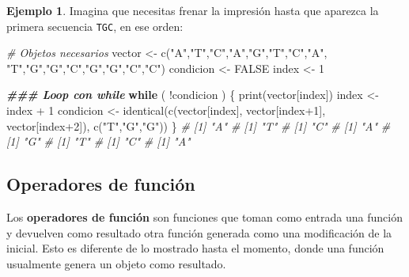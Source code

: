 \documentclass[
]{article}
\newenvironment{Shaded}{\begin{snugshade}}{\end{snugshade}}
\newcommand{\CommentTok}[1]{\textcolor[rgb]{0.56,0.35,0.01}{\textit{#1}}}
\newcommand{\ConstantTok}[1]{\textcolor[rgb]{0.00,0.00,0.00}{#1}}
\newcommand{\ControlFlowTok}[1]{\textcolor[rgb]{0.13,0.29,0.53}{\textbf{#1}}}
\newcommand{\DecValTok}[1]{\textcolor[rgb]{0.00,0.00,0.81}{#1}}
\newcommand{\DocumentationTok}[1]{\textcolor[rgb]{0.56,0.35,0.01}{\textbf{\textit{#1}}}}
\newcommand{\FunctionTok}[1]{\textcolor[rgb]{0.00,0.00,0.00}{#1}}
\newcommand{\NormalTok}[1]{#1}
\newcommand{\OtherTok}[1]{\textcolor[rgb]{0.56,0.35,0.01}{#1}}
\newcommand{\SpecialCharTok}[1]{\textcolor[rgb]{0.00,0.00,0.00}{#1}}
\newcommand{\StringTok}[1]{\textcolor[rgb]{0.31,0.60,0.02}{#1}}
\theoremstyle{definition}
\theoremstyle{definition}
\newtheorem{example}{Ejemplo}[section]
\theoremstyle{definition}
\theoremstyle{definition}
\theoremstyle{remark}
\begin{document}
\begin{example}

Imagina que necesitas frenar la impresión hasta que aparezca la primera secuencia \texttt{TGC}, en ese orden:

\begin{Shaded}
\begin{Highlighting}[]
\CommentTok{\# Objetos necesarios}
\NormalTok{vector }\OtherTok{\textless{}{-}} \FunctionTok{c}\NormalTok{(}\StringTok{"A"}\NormalTok{,}\StringTok{"T"}\NormalTok{,}\StringTok{"C"}\NormalTok{,}\StringTok{"A"}\NormalTok{,}\StringTok{"G"}\NormalTok{,}\StringTok{"T"}\NormalTok{,}\StringTok{"C"}\NormalTok{,}\StringTok{"A"}\NormalTok{,}
            \StringTok{"T"}\NormalTok{,}\StringTok{"G"}\NormalTok{,}\StringTok{"G"}\NormalTok{,}\StringTok{"C"}\NormalTok{,}\StringTok{"G"}\NormalTok{,}\StringTok{"G"}\NormalTok{,}\StringTok{"C"}\NormalTok{,}\StringTok{"C"}\NormalTok{)}
\NormalTok{condicion }\OtherTok{\textless{}{-}} \ConstantTok{FALSE}
\NormalTok{index }\OtherTok{\textless{}{-}} \DecValTok{1}

\DocumentationTok{\#\#\# Loop con while}
\ControlFlowTok{while}\NormalTok{ ( }\SpecialCharTok{!}\NormalTok{condicion ) \{ }
  \FunctionTok{print}\NormalTok{(vector[index]) }
\NormalTok{  index }\OtherTok{\textless{}{-}}\NormalTok{ index }\SpecialCharTok{+} \DecValTok{1} 
\NormalTok{  condicion }\OtherTok{\textless{}{-}} \FunctionTok{identical}\NormalTok{(}\FunctionTok{c}\NormalTok{(vector[index], vector[index}\SpecialCharTok{+}\DecValTok{1}\NormalTok{], }
\NormalTok{                           vector[index}\SpecialCharTok{+}\DecValTok{2}\NormalTok{]), }\FunctionTok{c}\NormalTok{(}\StringTok{"T"}\NormalTok{,}\StringTok{"G"}\NormalTok{,}\StringTok{"G"}\NormalTok{))}
\NormalTok{\}}
\CommentTok{\# [1] "A"}
\CommentTok{\# [1] "T"}
\CommentTok{\# [1] "C"}
\CommentTok{\# [1] "A"}
\CommentTok{\# [1] "G"}
\CommentTok{\# [1] "T"}
\CommentTok{\# [1] "C"}
\CommentTok{\# [1] "A"}
\end{Highlighting}
\end{Shaded}

\end{example}

\hypertarget{operadoresfuncion}{%
\subsection{Operadores de función}\label{operadoresfuncion}}

Los \textbf{operadores de función} son funciones que toman como entrada una función y devuelven como resultado otra función generada como una modificación de la inicial. Esto es diferente de lo mostrado hasta el momento, donde una función usualmente genera un objeto como resultado.
\end{document}
